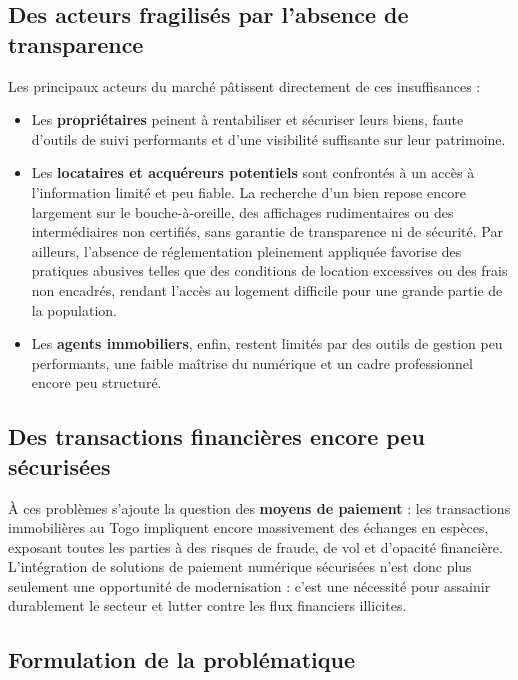 \documentclass[12pt,a4paper]{report}
\newcommand{\motcle}[1]{\textcolor{marine}{\textbf{#1}}}
\newcommand{\important}[1]{\textcolor{cuivre}{\textbf{#1}}}
\begin{document}
\begin{highlightbox}
\subsection{Des acteurs fragilisés par l'absence de transparence}

Les principaux acteurs du marché pâtissent directement de ces insuffisances :

\begin{itemize}
    \item Les \motcle{propriétaires} peinent à rentabiliser et sécuriser leurs biens, faute d'outils de suivi performants et d'une visibilité suffisante sur leur patrimoine.
    
    \item Les \motcle{locataires et acquéreurs potentiels} sont confrontés à un accès à l'information limité et peu fiable. La recherche d'un bien repose encore largement sur le bouche-à-oreille, des affichages rudimentaires ou des intermédiaires non certifiés, sans garantie de transparence ni de sécurité. Par ailleurs, l'absence de réglementation pleinement appliquée favorise des pratiques abusives telles que des conditions de location excessives ou des frais non encadrés, rendant l'accès au logement difficile pour une grande partie de la population.
    
    \item Les \motcle{agents immobiliers}, enfin, restent limités par des outils de gestion peu performants, une faible maîtrise du numérique et un cadre professionnel encore peu structuré.
\end{itemize}

\subsection{Des transactions financières encore peu sécurisées}

À ces problèmes s'ajoute la question des \important{moyens de paiement} : les transactions immobilières au Togo impliquent encore massivement des échanges en espèces, exposant toutes les parties à des risques de fraude, de vol et d'opacité financière. L'intégration de solutions de paiement numérique sécurisées n'est donc plus seulement une opportunité de modernisation : c'est une nécessité pour assainir durablement le secteur et lutter contre les flux financiers illicites.

\subsection{Formulation de la problématique}


\end{highlightbox}
\end{document}
